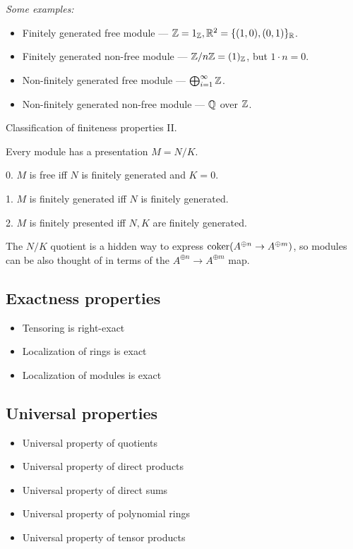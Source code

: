 \textit{Some examples:}
\begin{itemize}
    \item Finitely generated free module --- $\mathbb{Z} = {1}_{\mathbb{Z}}, \mathbb{R}^2 = \{(1,0), (0,1)\}_{\mathbb{R}}$.
    \item Finitely generated non-free module --- $\mathbb{Z}/n\mathbb{Z} = (1)_{\mathbb{Z}}$, but $1\cdot n = 0$.
    \item Non-finitely generated free module --- $\bigoplus_{i=1}^\infty \mathbb{Z}$.
    \item Non-finitely generated non-free module --- $\mathbb{Q}$ over $\mathbb{Z}$.
\end{itemize}

\begin{definition}
    Classification of finiteness properties II.
    
    Every module has a presentation $M=N/K$. 
    
    0. $M$ is free iff $N$ is finitely generated and $K=0$.
    
    1. $M$ is finitely generated iff $N$ is finitely generated.
    
    2. $M$ is finitely presented iff $N, K$ are finitely generated.

    The $N/K$ quotient is a hidden way to express $\operatorname{coker}(A^{\oplus n}\rightarrow A^{\oplus m})$, so modules can be also thought of in terms of the $A^{\oplus n}\rightarrow A^{\oplus m}$ map.
\end{definition}

\subsection{Exactness properties}
\begin{itemize}
    \item Tensoring is right-exact 
    \item Localization of rings is exact
    \item Localization of modules is exact
\end{itemize}

\subsection{Universal properties}
\begin{itemize}
    \item Universal property of quotients
    \item Universal property of direct products
    \item Universal property of direct sums
    \item Universal property of polynomial rings
    \item Universal property of tensor products
\end{itemize}

